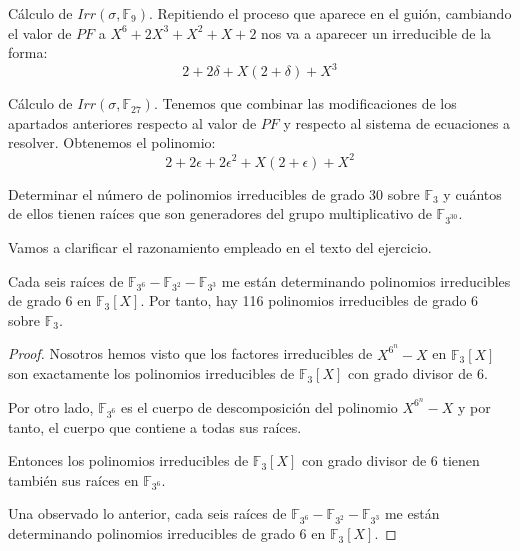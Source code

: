 Cálculo de $Irr(\sigma,\mathbb{F}_9)$. Repitiendo el proceso que aparece en el guión, cambiando el valor de $PF$ a $X^6+2X^3+X^2+X+2$ nos va a aparecer un irreducible de la forma: $$2 + 2 \delta + X (2 + \delta) + X^3$$ 

Cálculo de $Irr(\sigma,\mathbb{F}_{27})$. Tenemos que combinar las modificaciones de los apartados anteriores respecto al valor de $PF$ y respecto al sistema de ecuaciones a resolver. Obtenemos el polinomio: $$2 + 2 \epsilon + 2 \epsilon^2 + X (2 + \epsilon) + X^2$$

\begin{exercise}
	Determinar el número de polinomios irreducibles de grado 30 sobre $\mathbb{F}_3$ y cuántos de ellos tienen raíces que son generadores del grupo multiplicativo de $\mathbb{F}_{3^{30}}$.
\end{exercise}

Vamos a clarificar el razonamiento empleado en el texto del ejercicio.

\begin{proposition}
	Cada seis raíces de $\mathbb{F}_{3^6} - \mathbb{F}_{3^2} - \mathbb{F}_{3^3}$ me están determinando polinomios irreducibles de grado 6 en $\mathbb{F}_3[X]$. Por tanto, hay 116 polinomios irreducibles de grado 6 sobre $\mathbb{F}_3$.
\end{proposition}
\begin{proof}
Nosotros hemos visto que los factores irreducibles de $X^{6^n} - X$ en $\mathbb{F}_3[X]$ son exactamente los polinomios irreducibles de $\mathbb{F}_3[X]$ con grado divisor de $6$. 

Por otro lado, $\mathbb{F}_{3^6}$ es el cuerpo de descomposición del polinomio $X^{6^n} - X$ y por tanto, el cuerpo que contiene a todas sus raíces. 

Entonces los polinomios irreducibles de $\mathbb{F}_3[X]$ con grado divisor de $6$ tienen también sus raíces en $\mathbb{F}_{3^6}$. 

Una observado lo anterior, cada seis raíces de $\mathbb{F}_{3^6} - \mathbb{F}_{3^2} - \mathbb{F}_{3^3}$ me están determinando polinomios irreducibles de grado 6 en $\mathbb{F}_3[X]$. 
\end{proof}

